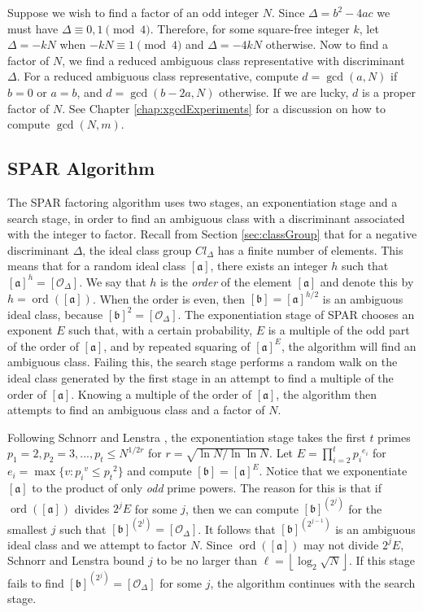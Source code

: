 \documentclass{ucalgthes1}
\theoremstyle{definition}
\DeclareMathOperator{\ord}{ord}
\newcommand{\floor}[1]{\left\lfloor #1 \right\rfloor}
\newcommand{\ideal}{\mathfrak}
\newcommand{\idealclass}[1]{\left[ \ideal #1 \right]}
\newcommand{\aclass}{\idealclass a}
\newcommand{\bclass}{\idealclass b}
\newcommand{\idclass}{[\mathcal O_\Delta]}
\begin{document}
Suppose we wish to find a factor of an odd integer $N$. Since $\Delta = b^2 - 4ac$ we must have $\Delta \equiv 0, 1 \pmod 4$.  Therefore, for some square-free integer $k$, let $\Delta = -kN$ when $-kN \equiv 1 \pmod 4$ and $\Delta = -4kN$ otherwise.  Now to find a factor of $N$, we find a reduced ambiguous class representative with discriminant $\Delta$.  For a reduced ambiguous class representative, compute $d = \gcd(a, N)$ if $b = 0$ or $a = b$, and $d = \gcd(b-2a, N)$ otherwise.  If we are lucky, $d$ is a proper factor of $N$. See Chapter \ref{chap:xgcdExperiments} for a discussion on how to compute $\gcd(N, m)$.



\subsection{SPAR Algorithm}
\label{subsec:sparAlg}

The SPAR factoring algorithm uses two stages, an exponentiation stage and a search stage, in order to find an ambiguous class with a discriminant associated with the integer to factor.  Recall from Section \ref{sec:classGroup} that for a negative discriminant $\Delta$, the ideal class group $Cl_\Delta$ has a finite number of elements.  This means that for a random ideal class $\aclass$, there exists an integer $h$ such that $\aclass^h = \idclass$. We say that $h$ is the \emph{order} of the element $\aclass$ and denote this by $h = \ord(\aclass)$.  When the order is even, then $\bclass = \aclass^{h/2}$ is an ambiguous ideal class, because $\bclass^2 = \idclass$.   The exponentiation stage of SPAR chooses an exponent $E$ such that, with a certain probability, $E$ is a multiple of the odd part of the order of $\aclass$, and by repeated squaring of $\aclass^E$, the algorithm will find an ambiguous class.  Failing this, the search stage performs a random walk on the ideal class generated by the first stage in an attempt to find a multiple of the order of $\aclass$.  Knowing a multiple of the order of $\aclass$, the algorithm then attempts to find an ambiguous class and a factor of $N$.

Following Schnorr and Lenstra \cite{Schnorr1984}, the exponentiation stage takes the first $t$ primes $p_1 = 2, p_2 = 3, ..., p_t \le N^{1/2r}$ for $r = \sqrt{\ln N / \ln \ln N}$.  Let $E = \prod_{i=2}^t {p_i}^{e_i}$ for $e_i = \max \{ v : {p_i}^v \le {p_t}^2 \}$ and compute $\bclass = \aclass^E$.  Notice that we exponentiate $\aclass$ to the product of only \emph{odd} prime powers.  The reason for this is that if $\ord(\aclass)$ divides $2^j E$ for some $j$, then we can compute $\bclass^{\left(2^j\right)}$ for the smallest $j$ such that $\bclass^{\left(2^j\right)} = \idclass$.  It follows that $\bclass^{\left(2^{j-1}\right)}$ is an ambiguous ideal class and we attempt to factor $N$.  Since $\ord(\aclass)$ may not divide $2^jE$, Schnorr and Lenstra \cite[p.291]{Schnorr1984} bound $j$ to be no larger than $\ell = \floor{\log_2{\sqrt N}}$.  If this stage fails to find $\bclass^{\left(2^j\right)} = \idclass$ for some $j$, the algorithm continues with the search stage.
\end{document}
